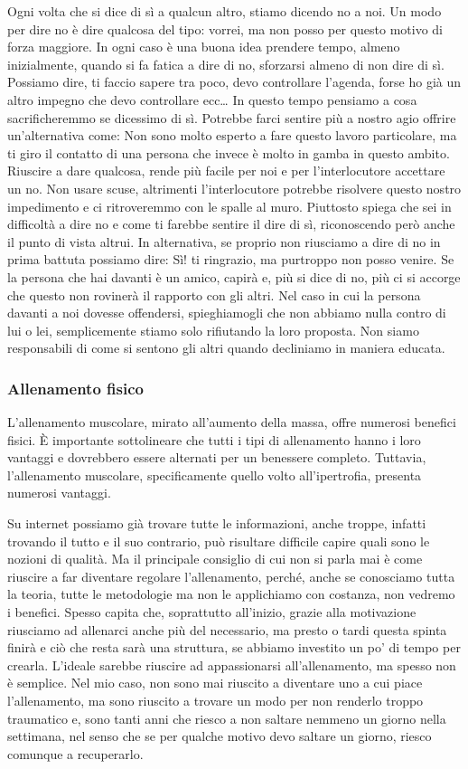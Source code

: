 \documentclass[12pt]{book} %
\begin{document}
Ogni volta che si dice di sì a qualcun altro, stiamo dicendo no a noi.
Un modo per dire no è dire qualcosa del tipo: vorrei, ma non posso per questo motivo di forza maggiore. In
ogni caso è una buona idea prendere tempo, almeno inizialmente, quando si fa fatica a dire di no, sforzarsi almeno di
non dire di sì. Possiamo dire, ti faccio sapere tra poco, devo controllare l'agenda, forse ho già
un altro impegno che devo controllare ecc… In questo tempo pensiamo a cosa sacrificheremmo se dicessimo di sì. Potrebbe
farci sentire più a nostro agio offrire un'alternativa come: Non sono molto esperto a fare questo
lavoro particolare, ma ti giro il contatto di una persona che invece è molto in gamba in questo ambito. Riuscire a dare
qualcosa, rende più facile per noi e per l'interlocutore accettare un no. Non usare scuse,
altrimenti l'interlocutore potrebbe risolvere questo nostro impedimento e ci ritroveremmo con le
spalle al muro. Piuttosto spiega che sei in difficoltà a dire no e come ti farebbe sentire il dire di sì, riconoscendo
però anche il punto di vista altrui. In alternativa, se proprio non riusciamo a dire di no in prima battuta possiamo
dire: Sì! ti ringrazio, ma purtroppo non posso venire. Se la persona che hai davanti è un amico, capirà e, più si dice
di no, più ci si accorge che questo non rovinerà il rapporto con gli altri. Nel caso in cui la persona davanti a noi
dovesse offendersi, spieghiamogli che non abbiamo nulla contro di lui o lei, semplicemente stiamo solo rifiutando la
loro proposta. Non siamo responsabili di come si sentono gli altri quando decliniamo in maniera educata.

\subsubsection{Allenamento fisico}
L'allenamento muscolare, mirato all'aumento della massa, offre numerosi benefici fisici. È importante sottolineare che tutti i tipi di allenamento hanno i loro vantaggi e dovrebbero essere alternati per un benessere completo. Tuttavia, l'allenamento muscolare, specificamente quello volto all'ipertrofia, presenta numerosi vantaggi.

Su internet possiamo già trovare tutte le informazioni, anche troppe, infatti trovando il tutto e il suo contrario, può risultare difficile capire quali sono le nozioni di qualità. Ma il principale consiglio di cui non si parla mai è come riuscire a far diventare regolare l'allenamento, perché, anche se conosciamo tutta la teoria, tutte le metodologie ma non le applichiamo con costanza, non vedremo i benefici. Spesso capita che, soprattutto all'inizio, grazie alla motivazione riusciamo ad allenarci anche più del necessario, ma presto o tardi questa spinta finirà e ciò che resta sarà una struttura, se abbiamo investito un po' di tempo per crearla. L'ideale sarebbe riuscire ad appassionarsi all'allenamento, ma spesso non è semplice. Nel mio caso, non sono mai riuscito a diventare uno a cui piace l'allenamento, ma sono riuscito a trovare un modo per non renderlo troppo traumatico e, sono tanti anni che riesco a non saltare nemmeno un giorno nella settimana, nel senso che se per qualche motivo devo saltare un giorno, riesco comunque a recuperarlo.
\end{document}
